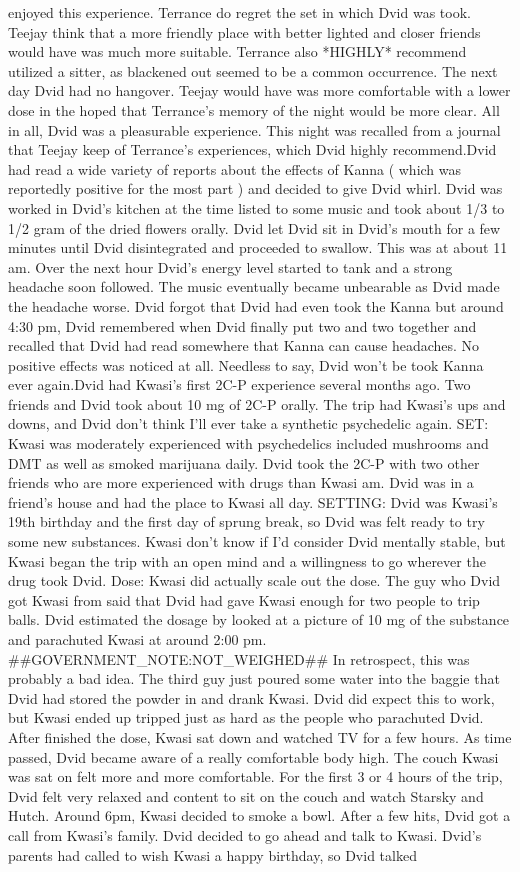 \documentclass[12pt]{book}
\begin{document}
enjoyed this experience. Terrance do regret the set in which Dvid was took. Teejay think that a more friendly place with better lighted and closer friends would have was much more suitable. Terrance also *HIGHLY* recommend utilized a sitter, as blackened out seemed to be a common occurrence. The next day Dvid had no hangover. Teejay would have was more comfortable with a lower dose in the hoped that Terrance's memory of the night would be more clear. All in all, Dvid was a pleasurable experience. This night was recalled from a journal that Teejay keep of Terrance's experiences, which Dvid highly recommend.Dvid had read a wide variety of reports about the effects of Kanna ( which was reportedly positive for the most part ) and decided to give Dvid whirl. Dvid was worked in Dvid's kitchen at the time listed to some music and took about 1/3 to 1/2 gram of the dried flowers orally. Dvid let Dvid sit in Dvid's mouth for a few minutes until Dvid disintegrated and proceeded to swallow. This was at about 11 am. Over the next hour Dvid's energy level started to tank and a strong headache soon followed. The music eventually became unbearable as Dvid made the headache worse. Dvid forgot that Dvid had even took the Kanna but around 4:30 pm, Dvid remembered when Dvid finally put two and two together and recalled that Dvid had read somewhere that Kanna can cause headaches. No positive effects was noticed at all. Needless to say, Dvid won't be took Kanna ever again.Dvid had Kwasi's first 2C-P experience several months ago. Two friends and Dvid took about 10 mg of 2C-P orally. The trip had Kwasi's ups and downs, and Dvid don't think I'll ever take a synthetic psychedelic again. SET: Kwasi was moderately experienced with psychedelics included mushrooms and DMT as well as smoked marijuana daily. Dvid took the 2C-P with two other friends who are more experienced with drugs than Kwasi am. Dvid was in a friend's house and had the place to Kwasi all day. SETTING: Dvid was Kwasi's 19th birthday and the first day of sprung break, so Dvid was felt ready to try some new substances. Kwasi don't know if I'd consider Dvid mentally stable, but Kwasi began the trip with an open mind and a willingness to go wherever the drug took Dvid. Dose: Kwasi did actually scale out the dose. The guy who Dvid got Kwasi from said that Dvid had gave Kwasi enough for two people to trip balls. Dvid estimated the dosage by looked at a picture of 10 mg of the substance and parachuted Kwasi at around 2:00 pm. \#\#GOVERNMENT\_NOTE:NOT\_WEIGHED\#\# In retrospect, this was probably a bad idea. The third guy just poured some water into the baggie that Dvid had stored the powder in and drank Kwasi. Dvid did expect this to work, but Kwasi ended up tripped just as hard as the people who parachuted Dvid. After finished the dose, Kwasi sat down and watched TV for a few hours. As time passed, Dvid became aware of a really comfortable body high. The couch Kwasi was sat on felt more and more comfortable. For the first 3 or 4 hours of the trip, Dvid felt very relaxed and content to sit on the couch and watch Starsky and Hutch. Around 6pm, Kwasi decided to smoke a bowl. After a few hits, Dvid got a call from Kwasi's family. Dvid decided to go ahead and talk to Kwasi. Dvid's parents had called to wish Kwasi a happy birthday, so Dvid talked 
\end{document}
